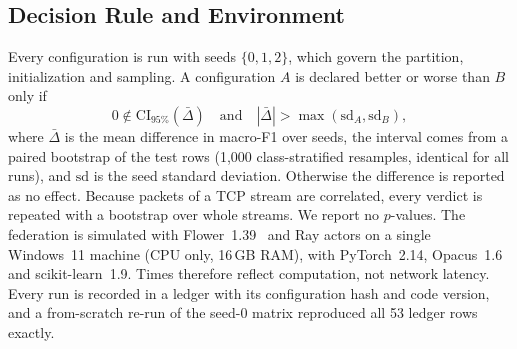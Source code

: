 \subsection{Decision Rule and Environment}
Every configuration is run with seeds $\{0, 1, 2\}$, which govern the partition, initialization and sampling. A configuration $A$ is declared better or worse than $B$ only if
\begin{equation}
0 \notin \mathrm{CI}_{95\%}(\bar{\Delta}) \quad \text{and} \quad |\bar{\Delta}| > \max(\mathrm{sd}_A, \mathrm{sd}_B),
\label{eq:decision_rule}
\end{equation}
where $\bar{\Delta}$ is the mean difference in macro-F1 over seeds, the interval comes from a paired bootstrap of the test rows (1,000 class-stratified resamples, identical for all runs), and $\mathrm{sd}$ is the seed standard deviation. Otherwise the difference is reported as no effect. Because packets of a TCP stream are correlated, every verdict is repeated with a bootstrap over whole streams. We report no $p$-values. The federation is simulated with Flower~1.39~\cite{beutel2020} and Ray actors on a single Windows~11 machine (CPU only, 16\,GB RAM), with PyTorch~2.14, Opacus~1.6 and scikit-learn~1.9. Times therefore reflect computation, not network latency. Every run is recorded in a ledger with its configuration hash and code version, and a from-scratch re-run of the seed-0 matrix reproduced all 53 ledger rows exactly.
